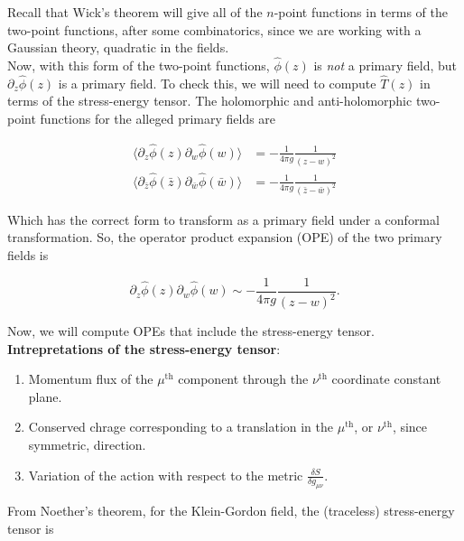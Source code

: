 \noindent Recall that Wick's theorem will give all of the $n$-point functions in terms of the two-point functions, after some combinatorics, since we are working with a Gaussian theory, quadratic in the fields. \\

\noindent Now, with this form of the two-point functions, $\hat{\phi} (z)$ is \textit{not} a primary field, but $\partial_z \hat{\phi} (z)$ is a primary field. To check this, we will need to compute $\hat{T} (z)$ in terms of the stress-energy tensor. The holomorphic and anti-holomorphic two-point functions for the alleged primary fields are

\begin{align}
\langle \partial_z \hat{\phi} (z) \partial_w \hat{\phi} (w) \rangle &= - \frac{1}{4 \pi g} \frac{1}{(z-w)^2} \\
\langle \partial_{\bar{z}} \hat{\phi} (\bar{z}) \partial_{\bar{w}} \hat{\phi} (\bar{w}) \rangle &= - \frac{1}{4 \pi g} \frac{1}{(\bar{z}-\bar{w})^2}
\end{align}

\noindent Which has the correct form to transform as a primary field under a conformal transformation. So, the operator product expansion (OPE) of the two primary fields is 

\begin{equation}
\partial_z \hat{\phi} (z) \partial_w \hat{\phi} (w) \sim - \frac{1}{4 \pi g} \frac{1}{(z-w)^2}.
\end{equation}

\noindent Now, we will compute OPEs that include the stress-energy tensor. \\

\noindent \textbf{Intrepretations of the stress-energy tensor}: \\

\begin{enumerate}
\item Momentum flux of the $\mu^{\text{th}}$ component through the $\nu^{\text{th}}$ coordinate constant plane.
\item Conserved chrage corresponding to a translation in the $\mu^{\text{th}}$, or $\nu^{\text{th}}$, since symmetric, direction.
\item Variation of the action with respect to the metric $\frac{\delta S}{\delta g_{\mu\nu}}$.
\end{enumerate}

\noindent From Noether's theorem, for the Klein-Gordon field, the (traceless) stress-energy tensor is

